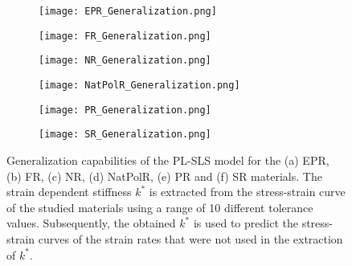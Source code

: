 \begin{figure}[htbp!]
	\centering
    \begin{subfigure}[b]{0.49\textwidth}
        \centering
        \texttt{[image: EPR\_Generalization.png]}
        \caption{}
        \label{fig:GenEPR}
    \end{subfigure}
    \begin{subfigure}[b]{0.49\textwidth}
        \centering
        \texttt{[image: FR\_Generalization.png]}
        \caption{}
        \label{fig:GenFR}
    \end{subfigure}
    \begin{subfigure}[b]{0.49\textwidth}
        \centering
        \texttt{[image: NR\_Generalization.png]}
        \caption{}
        \label{fig:GenNR}
    \end{subfigure}
    \begin{subfigure}[b]{0.49\textwidth}
        \centering
        \texttt{[image: NatPolR\_Generalization.png]}
        \caption{}
        \label{fig:GenNatPolR}
    \end{subfigure}  
    \begin{subfigure}[b]{0.49\textwidth}
        \centering
        \texttt{[image: PR\_Generalization.png]}
        \caption{}
        \label{fig:GenPR}
    \end{subfigure}  
    \begin{subfigure}[b]{0.49\textwidth}
        \centering
        \texttt{[image: SR\_Generalization.png]}
        \caption{}
        \label{fig:GenSR}
    \end{subfigure}  
    \caption{Generalization capabilities of the PL-SLS model for the (a) EPR, (b) FR, (c) NR, (d) NatPolR, (e) PR and (f) SR materials. The strain dependent stiffness $k^*$ is extracted from the stress-strain curve of the studied materials using a range of 10 different tolerance values. Subsequently, the obtained $k^*$ is used to predict the stress-strain curves of the strain rates that were not used in the extraction of $k^*$.}
    \label{fig:GenAlmostAll}
\end{figure}

